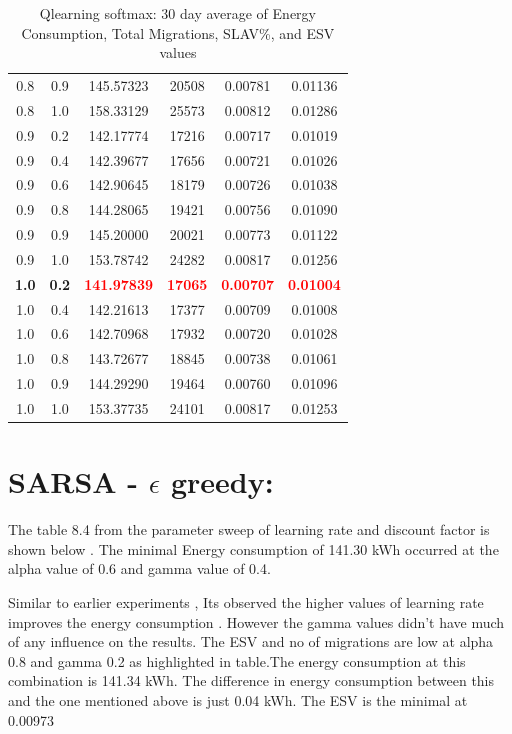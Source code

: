 \documentclass[a4paper,12pt]{Classes/RoboticsLaTeX}
\begin{document}
\begin{table}[H]
\begin{tabular}{|c|c|c|c|c|c|}
        0.8 & 0.9 & 145.57323 & 20508 & 0.00781 & 0.01136 \\ 
        0.8 & 1.0 & 158.33129 & 25573 & 0.00812 & 0.01286 \\ 
        0.9 & 0.2 & 142.17774 & 17216 & 0.00717 & 0.01019 \\ 
        0.9 & 0.4 & 142.39677 & 17656 & 0.00721 & 0.01026 \\ 
        0.9 & 0.6 & 142.90645 & 18179 & 0.00726 & 0.01038 \\ 
        0.9 & 0.8 & 144.28065 & 19421 & 0.00756 & 0.01090 \\ 
        0.9 & 0.9 & 145.20000 & 20021 & 0.00773 & 0.01122 \\ 
        0.9 & 1.0 & 153.78742 & 24282 & 0.00817 & 0.01256 \\ 
        \textbf{1.0} & \textbf{0.2} & \textbf{\textcolor{red}{141.97839}} & \textbf{\textcolor{red}{17065}} & \textbf{\textcolor{red}{0.00707}} & \textbf{\textcolor{red}{0.01004}} \\ 
        1.0 & 0.4 & 142.21613 & 17377 & 0.00709 & 0.01008 \\ 
        1.0 & 0.6 & 142.70968 & 17932 & 0.00720 & 0.01028 \\ 
        1.0 & 0.8 & 143.72677 & 18845 & 0.00738 & 0.01061 \\ 
        1.0 & 0.9 & 144.29290 & 19464 & 0.00760 & 0.01096 \\ 
        1.0 & 1.0 & 153.37735 & 24101 & 0.00817 & 0.01253 \\ 
        \hline
        \end{tabular}
        \caption{Qlearning softmax: 30 day average of Energy Consumption, Total Migrations, SLAV\%, and ESV values}
        \end{table}

        \section{SARSA - $\epsilon$ greedy:}

        The table 8.4 from the parameter sweep of learning rate and discount factor is shown below .  The minimal Energy consumption of 141.30 kWh occurred at the alpha value of 0.6 and gamma value of 0.4.
        
        Similar to earlier experiments , Its observed the higher values of learning rate improves the energy consumption . However the gamma values didn't have much of any influence on the results. The ESV and no of migrations are low at alpha 0.8 and gamma 0.2 as highlighted in table.The energy consumption at this combination is 141.34 kWh. The difference in energy consumption between this   and the one mentioned above is just 0.04 kWh. The ESV is the minimal at 0.00973
\end{document}
